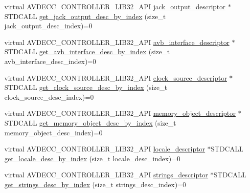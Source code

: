 \begin{DoxyCompactItemize}
\item 
virtual A\+V\+D\+E\+C\+C\+\_\+\+C\+O\+N\+T\+R\+O\+L\+L\+E\+R\+\_\+\+L\+I\+B32\+\_\+\+A\+PI \hyperlink{classavdecc__lib_1_1jack__output__descriptor}{jack\+\_\+output\+\_\+descriptor} $\ast$S\+T\+D\+C\+A\+LL \hyperlink{classavdecc__lib_1_1configuration__descriptor_ae6a68f83733b54540614b729548a180b}{get\+\_\+jack\+\_\+output\+\_\+desc\+\_\+by\+\_\+index} (size\+\_\+t jack\+\_\+output\+\_\+desc\+\_\+index)=0
\item 
virtual A\+V\+D\+E\+C\+C\+\_\+\+C\+O\+N\+T\+R\+O\+L\+L\+E\+R\+\_\+\+L\+I\+B32\+\_\+\+A\+PI \hyperlink{classavdecc__lib_1_1avb__interface__descriptor}{avb\+\_\+interface\+\_\+descriptor} $\ast$S\+T\+D\+C\+A\+LL \hyperlink{classavdecc__lib_1_1configuration__descriptor_a177c390ccb74a31750b8eb0feb406144}{get\+\_\+avb\+\_\+interface\+\_\+desc\+\_\+by\+\_\+index} (size\+\_\+t avb\+\_\+interface\+\_\+desc\+\_\+index)=0
\item 
virtual A\+V\+D\+E\+C\+C\+\_\+\+C\+O\+N\+T\+R\+O\+L\+L\+E\+R\+\_\+\+L\+I\+B32\+\_\+\+A\+PI \hyperlink{classavdecc__lib_1_1clock__source__descriptor}{clock\+\_\+source\+\_\+descriptor} $\ast$S\+T\+D\+C\+A\+LL \hyperlink{classavdecc__lib_1_1configuration__descriptor_aefc07c368de7626396dbf6d6605f1b48}{get\+\_\+clock\+\_\+source\+\_\+desc\+\_\+by\+\_\+index} (size\+\_\+t clock\+\_\+source\+\_\+desc\+\_\+index)=0
\item 
virtual A\+V\+D\+E\+C\+C\+\_\+\+C\+O\+N\+T\+R\+O\+L\+L\+E\+R\+\_\+\+L\+I\+B32\+\_\+\+A\+PI \hyperlink{classavdecc__lib_1_1memory__object__descriptor}{memory\+\_\+object\+\_\+descriptor} $\ast$S\+T\+D\+C\+A\+LL \hyperlink{classavdecc__lib_1_1configuration__descriptor_aec4a4aacf26169bc5dd38bc719f4ae82}{get\+\_\+memory\+\_\+object\+\_\+desc\+\_\+by\+\_\+index} (size\+\_\+t memory\+\_\+object\+\_\+desc\+\_\+index)=0
\item 
virtual A\+V\+D\+E\+C\+C\+\_\+\+C\+O\+N\+T\+R\+O\+L\+L\+E\+R\+\_\+\+L\+I\+B32\+\_\+\+A\+PI \hyperlink{classavdecc__lib_1_1locale__descriptor}{locale\+\_\+descriptor} $\ast$S\+T\+D\+C\+A\+LL \hyperlink{classavdecc__lib_1_1configuration__descriptor_a7d32e35d54b0dfaa2e99318315029269}{get\+\_\+locale\+\_\+desc\+\_\+by\+\_\+index} (size\+\_\+t locale\+\_\+desc\+\_\+index)=0
\item 
virtual A\+V\+D\+E\+C\+C\+\_\+\+C\+O\+N\+T\+R\+O\+L\+L\+E\+R\+\_\+\+L\+I\+B32\+\_\+\+A\+PI \hyperlink{classavdecc__lib_1_1strings__descriptor}{strings\+\_\+descriptor} $\ast$S\+T\+D\+C\+A\+LL \hyperlink{classavdecc__lib_1_1configuration__descriptor_a34531c290e12e85895a804c067e9919e}{get\+\_\+strings\+\_\+desc\+\_\+by\+\_\+index} (size\+\_\+t strings\+\_\+desc\+\_\+index)=0

\end{DoxyCompactItemize}
